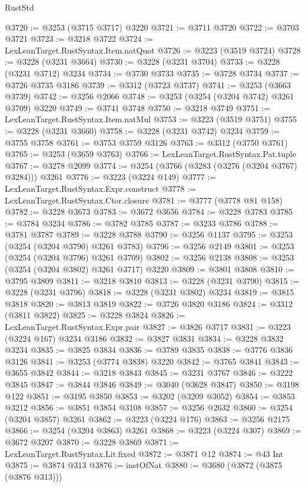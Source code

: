 \begin{lexlean}{RustStd}
\begin{coremodule}
@3720 := @3253 (@3715 @3717) @3220
@3721 := @3711 @3720
@3722 := @3703 @3721
@3723 := @3218 @3722
@3724 := LexLeanTarget.RustSyntax.Item.natQuot
@3726 := @3223 (@3519 @3724)
@3728 := @3228 (@3231 @3664)
@3730 := @3228 (@3231 @3704)
@3733 := @3228 (@3231 @3712) @3234
@3734 := @3730 @3733
@3735 := @3728 @3734
@3737 := @3726 @3735 @3186
@3739 := @3312 (@3723 @3737)
@3741 := @3253 (@3663 @3739)
@3742 := @3256 @2066
@3748 := @3253 (@3254 (@3204 @3742) @3261 @3709) @3220
@3749 := @3741 @3748
@3750 := @3218 @3749
@3751 := LexLeanTarget.RustSyntax.Item.natMul
@3753 := @3223 (@3519 @3751)
@3755 := @3228 (@3231 @3660)
@3758 := @3228 (@3231 @3742) @3234
@3759 := @3755 @3758
@3761 := @3753 @3759 @3126
@3763 := @3312 (@3750 @3761)
@3765 := @3253 (@3659 @3763)
@3766 := LexLeanTarget.RustSyntax.Pat.tuple
@3767 := @3278 @2099
@3774 := @3254 (@3766 (@3283 (@3276 (@3204 @3767) @3284))) @3261
@3776 := @3223 (@3224 @149)
@3777 := LexLeanTarget.RustSyntax.Expr.construct
@3778 := LexLeanTarget.RustSyntax.Ctor.closure
@3781 := @3777 (@3778 @81 @158)
@3782 := @3228 @3673
@3783 := @3672 @3656
@3784 := @3228 @3783
@3785 := @3784 @3234
@3786 := @3782 @3785
@3787 := @3233 @3786
@3788 := @3781 @3787
@3789 := @3228 @3788
@3790 := @3256 @1137
@3795 := @3253 (@3254 (@3204 @3790) @3261 @3783)
@3796 := @3256 @2149
@3801 := @3253 (@3254 (@3204 @3796) @3261 @3709)
@3802 := @3256 @2138
@3808 := @3253 (@3254 (@3204 @3802) @3261 @3717) @3220
@3809 := @3801 @3808
@3810 := @3795 @3809
@3811 := @3218 @3810
@3813 := @3228 (@3231 @3790)
@3815 := @3228 (@3231 @3796)
@3818 := @3228 (@3231 @3802) @3234
@3819 := @3815 @3818
@3820 := @3813 @3819
@3822 := @3726 @3820 @3186
@3824 := @3312 (@3811 @3822)
@3825 := @3228 @3824
@3826 := LexLeanTarget.RustSyntax.Expr.pair
@3827 := @3826 @3717
@3831 := @3223 (@3224 @167) @3234 @3186
@3832 := @3827 @3831
@3834 := @3228 @3832 @3234
@3835 := @3825 @3834
@3836 := @3789 @3835
@3838 := @3776 @3836 @3126
@3841 := @3253 (@3774 @3838) @3220
@3842 := @3765 @3841
@3843 := @3655 @3842
@3844 := @3218 @3843
@3845 := @3231 @3767
@3846 := @3222 @3845
@3847 := @3844 @3846
@3849 := @3040 (@3628 @3847)
@3850 := @3198 @122
@3851 := @3195 @3850
@3853 := @3202 (@3209 @3052)
@3854 := @3853 @3212
@3856 := @3851 @3854 @3108
@3857 := @3256 @2632
@3860 := @3254 (@3204 @3857) @3261
@3862 := @3223 (@3224 @176)
@3863 := @3256 @2175
@3866 := @3254 (@3204 @3863) @3261
@3868 := @3223 (@3224 @307)
@3869 := @3672 @3207
@3870 := @3228 @3869
@3871 := LexLeanTarget.RustSyntax.Lit.fixed
@3872 := @3871 @12
@3874 := @43 Int
@3875 := @3874 @313
@3876 := instOfNat
@3880 := @3680 (@3872 (@3875 (@3876 @313)))

\end{coremodule}
\end{lexlean}
